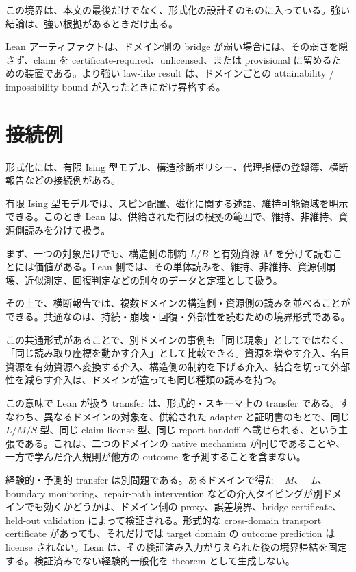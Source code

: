 \documentclass[12pt,a4paper]{article}
\begin{document}
この境界は、本文の最後だけでなく、形式化の設計そのものに入っている。強い結論は、強い根拠があるときだけ出る。

Lean アーティファクトは、ドメイン側の bridge が弱い場合には、その弱さを隠さず、claim を certificate-required、unlicensed、または provisional に留めるための装置である。より強い law-like result は、ドメインごとの attainability / impossibility bound が入ったときにだけ昇格する。

\section{接続例}\label{ux63a5ux7d9aux4f8b}

形式化には、有限 Ising 型モデル、構造診断ポリシー、代理指標の登録簿、横断報告などの接続例がある。

有限 Ising 型モデルでは、スピン配置、磁化に関する述語、維持可能領域を明示できる。このとき Lean は、供給された有限の根拠の範囲で、維持、非維持、資源側読みを分けて扱う。

まず、一つの対象だけでも、構造側の制約 \(L/B\) と有効資源 \(M\) を分けて読むことには価値がある。Lean 側では、その単体読みを、維持、非維持、資源側崩壊、近似測定、回復判定などの別々のデータと定理として扱う。

その上で、横断報告では、複数ドメインの構造側・資源側の読みを並べることができる。共通なのは、持続・崩壊・回復・外部性を読むための境界形式である。

この共通形式があることで、別ドメインの事例も「同じ現象」としてではなく、「同じ読み取り座標を動かす介入」として比較できる。資源を増やす介入、名目資源を有効資源へ変換する介入、構造側の制約を下げる介入、結合を切って外部性を減らす介入は、ドメインが違っても同じ種類の読みを持つ。

この意味で Lean が扱う transfer は、形式的・スキーマ上の transfer である。すなわち、異なるドメインの対象を、供給された adapter と証明書のもとで、同じ \(L/M/S\) 型、同じ claim-license 型、同じ report handoff へ載せられる、という主張である。これは、二つのドメインの native mechanism が同じであることや、一方で学んだ介入規則が他方の outcome を予測することを含まない。

経験的・予測的 transfer は別問題である。あるドメインで得た \(+M\)、\(-L\)、boundary monitoring、repair-path intervention などの介入タイピングが別ドメインでも効くかどうかは、ドメイン側の proxy、誤差境界、bridge certificate、held-out validation によって検証される。形式的な cross-domain transport certificate があっても、それだけでは target domain の outcome prediction は license されない。Lean は、その検証済み入力が与えられた後の境界帰結を固定する。検証済みでない経験的一般化を theorem として生成しない。
\end{document}
